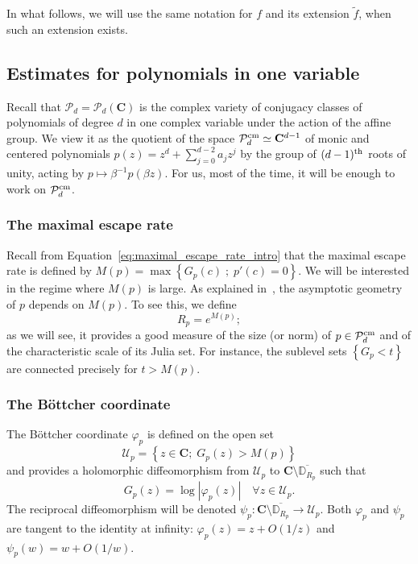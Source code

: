 \documentclass[oneside, 12pt]{amsart}
\newcommand{\disk}{\mathbb{D}}
\newcommand{\set}[1]{\left\{#1\right\}}
\newcommand{\abs}[1]{\left\vert#1\right\vert}
\newcommand{\inv}{^{-1}}
\newcommand{\C}{\mathbf{C}}
\theoremstyle{plain}
\theoremstyle{definition}
\numberwithin{equation}{section}       %
\numberwithin{equation}{section}       %
\begin{document}
In what follows, we will use the same notation for $f$ and its extension $\tilde f$, when such an extension exists. 
 

\subsection{Estimates for polynomials in one variable}\label{subs:polynomials}
Recall that  $\mathcal P_d = \mathcal P_d(\C)$ is the complex variety of conjugacy classes of polynomials of degree $d$ in one  complex variable under the action of the affine group. 
We   view it as   the quotient of the space 
$\mathcal P_d^{\rm cm}\simeq \C^{d-1}$ of monic and centered polynomials $p(z)=z^d+ \sum_{j=0}^{d-2} a_j z^j$ by the group of $(d-1)^{\rm th}$ roots of unity, acting by 
 $p\mapsto \beta\inv p(\beta z)$. 
For us, most of the time,  it will be enough to work on $\mathcal P_d^{\rm cm}$. 

\subsubsection{The maximal escape rate} Recall from Equation~\eqref{eq:maximal_escape_rate_intro} that  the  {maximal escape rate} is defined by
$
 M(p)= \max\set{G_p(c) \; ;\; p'(c)=0}.
$
We will be interested in the regime where  $M(p)$ is large.
As explained in~\cite{branner-hubbard1},  the asymptotic geometry of $p$ depends on $M(p)$. To see this, 
we define 
\begin{equation}
R_p =  e^{M(p)};
\end{equation}
as we will see, it provides a good measure of the size (or norm) of $p\in \mathcal P_d^{\rm cm}$ and of the characteristic scale of its Julia set.
For instance, the sublevel sets $\set{G_p<t}$ are connected precisely for $t>M(p)$. 


\subsubsection{The Böttcher coordinate} 
The Böttcher coordinate $\varphi_p$ is defined on the open set 
\begin{equation}
{\mathcal{U}}_p=\set{z\in \C; \; G_p(z)> M(p)}
\end{equation}
and provides a holomorphic diffeomorphism from ${\mathcal{U}}_p$ to $\C\setminus\overline{\disk_{R_p}}$
such that 
\begin{equation}
G_p(z)=\log\abs{\varphi_p(z)}\quad \forall z\in {\mathcal{U}}_p.
\end{equation}  
The reciprocal diffeomorphism will be denoted $\psi_p\colon \C\setminus\overline{\disk_{R_p}}\to {\mathcal{U}}_p$. 
Both $\varphi_p$ and $\psi_p$ are tangent to the identity at infinity: $\varphi_p(z) = z+ O(1/z)$ 
and $\psi_p(w) = w+O(1/w)$. 
\end{document}
